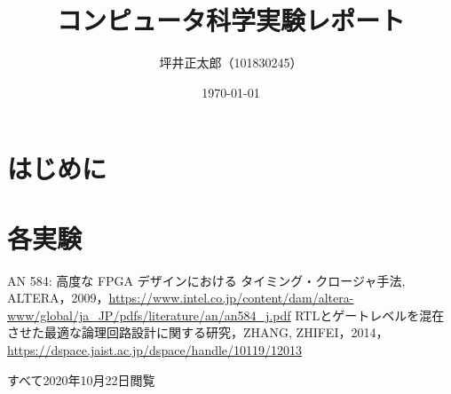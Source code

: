 \documentclass[a4paper,15pt]{jsarticle}
\begin{document}
\title{コンピュータ科学実験レポート}
\author{坪井正太郎（101830245）}
\date{\today}
\maketitle

\section*{はじめに}

\section*{各実験}


\begin{thebibliography}{99}
  AN 584: 高度な FPGA デザインにおける  タイミング・クロージャ手法, ALTERA，2009，\url{https://www.intel.co.jp/content/dam/altera-www/global/ja_JP/pdfs/literature/an/an584_j.pdf}
   RTLとゲートレベルを混在させた最適な論理回路設計に関する研究，ZHANG, ZHIFEI，2014，\url{https://dspace.jaist.ac.jp/dspace/handle/10119/12013}
\end{thebibliography}
すべて2020年10月22日閲覧
\end{document}
